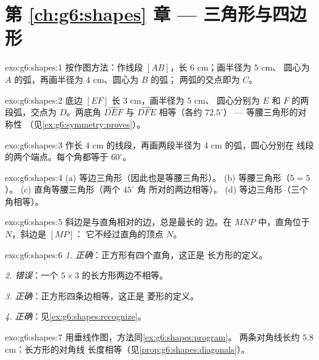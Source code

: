 \section*{第 \ref{ch:g6:shapes} 章 --- 三角形与四边形}

\begin{solution}{exo:g6:shapes:1}
按作图方法：作线段 $[AB]$，长 $6$ cm；画半径为 $5$ cm、
圆心为 $A$ 的弧，再画半径为 $4$ cm、圆心为 $B$ 的弧；
两弧的交点即为 $C$。
\end{solution}

\begin{solution}{exo:g6:shapes:2}
底边 $[EF]$ 长 $3$ cm，画半径为 $5$ cm、
圆心分别为 $E$ 和 $F$ 的两段弧，交点为 $D$。两底角 $\widehat{DEF}$
与 $\widehat{DFE}$ 相等（各约 $72.5^\circ$） --- 等腰三角形的对称性
（见\cref{ex:g6:symmetry:proves}）。
\end{solution}

\begin{solution}{exo:g6:shapes:3}
作长 $4$ cm 的线段，再画两段半径为 $4$ cm 的弧，圆心分别在
线段的两个端点。每个角都等于 $60^\circ$。
\end{solution}

\begin{solution}{exo:g6:shapes:4}
(a) 等边三角形（因此也是等腰三角形）。\quad
(b) 等腰三角形（$5 = 5$）。\quad
(c) 直角等腰三角形（两个 $45^\circ$ 角
所对的两边相等）。\quad
(d) 等边三角形（三个角相等）。
\end{solution}

\begin{solution}{exo:g6:shapes:5}
斜边是与直角相对的边，总是最长的
边。在 $MNP$ 中，直角位于 $N$，斜边是 $[MP]$：
它不经过直角的顶点 $N$。
\end{solution}

\begin{solution}{exo:g6:shapes:6}
\emph{1. 正确}：正方形有四个直角，这正是
长方形的定义。

\emph{2. 错误}：一个 $5 \times 3$ 的长方形两边不相等。

\emph{3. 正确}：正方形四条边相等，这正是
菱形的定义。

\emph{4. 正确}：见\cref{ex:g6:shapes:recognize}。
\end{solution}

\begin{solution}{exo:g6:shapes:7}
用垂线作图，方法同\cref{ex:g6:shapes:program}。
两条对角线长约 $5.8$ cm：长方形的对角线
长度相等（见\cref{prop:g6:shapes:diagonals}）。
\end{solution}

